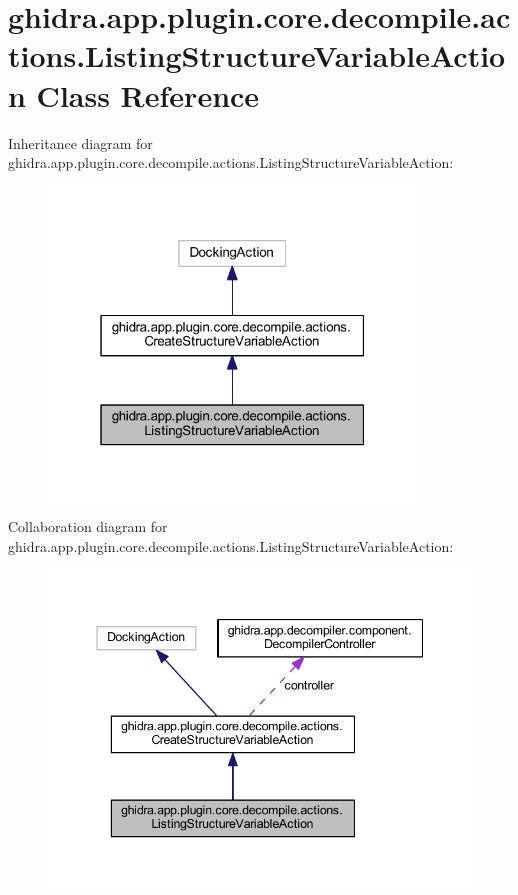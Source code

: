 \hypertarget{classghidra_1_1app_1_1plugin_1_1core_1_1decompile_1_1actions_1_1_listing_structure_variable_action}{}\section{ghidra.\+app.\+plugin.\+core.\+decompile.\+actions.\+Listing\+Structure\+Variable\+Action Class Reference}
\label{classghidra_1_1app_1_1plugin_1_1core_1_1decompile_1_1actions_1_1_listing_structure_variable_action}


Inheritance diagram for ghidra.\+app.\+plugin.\+core.\+decompile.\+actions.\+Listing\+Structure\+Variable\+Action\+:
\nopagebreak
\begin{figure}[H]
\begin{center}
\leavevmode
\includegraphics[width=277pt]{classghidra_1_1app_1_1plugin_1_1core_1_1decompile_1_1actions_1_1_listing_structure_variable_action__inherit__graph}
\end{center}
\end{figure}


Collaboration diagram for ghidra.\+app.\+plugin.\+core.\+decompile.\+actions.\+Listing\+Structure\+Variable\+Action\+:
\nopagebreak
\begin{figure}[H]
\begin{center}
\leavevmode
\includegraphics[width=344pt]{classghidra_1_1app_1_1plugin_1_1core_1_1decompile_1_1actions_1_1_listing_structure_variable_action__coll__graph}
\end{center}
\end{figure}
